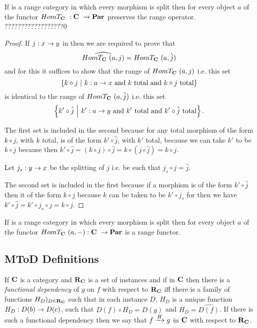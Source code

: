\documentclass[10pt,a4paper]{article}
\theoremstyle{remark}
\renewcommand{\term}[1]{\textit{#1}}  %
\begin{document}
 \begin{lemma}
If \catcw is a range category in which every morphism is split then
for every object $a$ of \catcw the functor $HomT_\catcw: \catcw \morph \Par$ preserves the range operator.  ??????????????????0
\end{lemma}
\begin{proof}
If $j: x \morph y$ in \catcw then we are required to prove that
$$\widehat{HomT_\catcw(a,j)}=HomT_\catcw(a,\hat{j})$$
and for this it suffices to show that the range of $HomT_\catcw(a,j)$ i.e. this set
$$\setsuchthat{ k \circ j}{k: a \morph x 
      \mbox{ and } k \mbox{ total and } k \circ j \mbox{ total} }$$ 
is identical to the range of $HomT_\catcw(a,\hat{j})$ i.e. this set
$$\setsuchthat{k' \circ \hat{j}}{k':a \morph y 
      \mbox{ and } k' \mbox{ total and } k' \circ \hat{j} \mbox{ total}}.$$

The first set is included in the second because for any total morphism of the form $k \circ j$, with $k$ total, is of the form $k' \circ \hat{j}$, with $k'$ total, because we can take $k'$ to be $k \circ j$ because then $k' \circ \hat{j} = (k \circ j) \circ \hat{j}= k \circ(j \circ \hat{j})= k \circ j$. 

Let $j_s : y \morph x$ be the splitting of $j$ i.e. be such that $j_s \circ j = \hat{j}$.

The second set is included in the first because if a morphism is of the form $k' \circ \hat{j}$ then it of the form $k \circ j$ because $k$ can be taken to be $k' \circ j_s$ for then we have $k' \circ \hat{j} = k' \circ j_s \circ j = k \circ j$. 
 \end{proof}

\begin{corollary}
If \catcw is a range category in which every morphism is split then
for every object $a$ of \catcw the functor $HomT_\catcw(a,-): \catcw \morph \Par$ is a range functor.
\end{corollary}


\subsection{MToD Definitions}

\begin{definition}
If $\catc$ is a category and $\reqtc$ is a set of instances and if \fgsourcediag
in $\catc$ then there is a  \term{functional dependency} of $g$ on $f$ with respect to $\reqtc$ iff
there is a family of functions $H_D)_{D \in \reqtc}$ such that 
in each instance $D$, $H_D$ is a unique function $H_D: D(b) \morph D(c)$, such that $D(f) \circ H_D = D(g)$ and $\overline{H_D}=\widehat{D(f)}$.
If there is such a functional dependency then we say that $\fundep{H}{f}{g}$ in $\catc$ with respect to $\reqtc$.
\end{definition}
\end{document}
